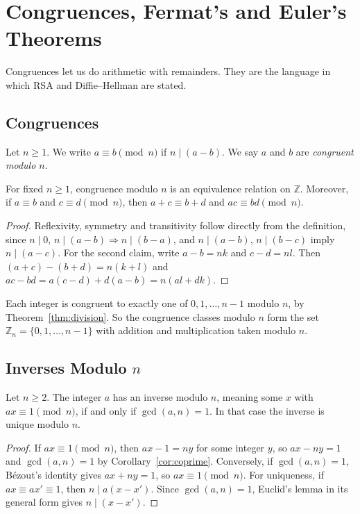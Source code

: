 \chapter{Congruences, Fermat's and Euler's Theorems}\label{ch:congruences}

Congruences let us do arithmetic with remainders. They are the language in which RSA and Diffie--Hellman are stated.

\section{Congruences}

\begin{definition}
Let $n\ge 1$. We write $a\equiv b\pmod n$ if $n\mid (a-b)$. We say $a$ and $b$ are \emph{congruent modulo $n$}.
\end{definition}

\begin{proposition}\label{prop:cong-equiv}
For fixed $n\ge 1$, congruence modulo $n$ is an equivalence relation on $\mathbb{Z}$. Moreover, if $a\equiv b$ and $c\equiv d\pmod n$, then $a+c\equiv b+d$ and $ac\equiv bd\pmod n$.
\end{proposition}

\begin{proof}
Reflexivity, symmetry and transitivity follow directly from the definition, since $n\mid 0$, $n\mid(a-b)\Rightarrow n\mid(b-a)$, and $n\mid(a-b)$, $n\mid(b-c)$ imply $n\mid(a-c)$. For the second claim, write $a-b=nk$ and $c-d=nl$. Then $(a+c)-(b+d)=n(k+l)$ and $ac-bd=a(c-d)+d(a-b)=n(al+dk)$.
\end{proof}

Each integer is congruent to exactly one of $0,1,\dots,n-1$ modulo $n$, by Theorem~\ref{thm:division}. So the congruence classes modulo $n$ form the set $\mathbb{Z}_n=\{0,1,\dots,n-1\}$ with addition and multiplication taken modulo $n$.

\section{Inverses Modulo $n$}

\begin{theorem}\label{thm:inverse}
Let $n\ge 2$. The integer $a$ has an inverse modulo $n$, meaning some $x$ with $ax\equiv 1\pmod n$, if and only if $\gcd(a,n)=1$. In that case the inverse is unique modulo $n$.
\end{theorem}

\begin{proof}
If $ax\equiv 1\pmod n$, then $ax-1=ny$ for some integer $y$, so $ax-ny=1$ and $\gcd(a,n)=1$ by Corollary~\ref{cor:coprime}. Conversely, if $\gcd(a,n)=1$, Bézout's identity gives $ax+ny=1$, so $ax\equiv 1\pmod n$. For uniqueness, if $ax\equiv ax'\equiv 1$, then $n\mid a(x-x')$. Since $\gcd(a,n)=1$, Euclid's lemma in its general form gives $n\mid (x-x')$.
\end{proof}

